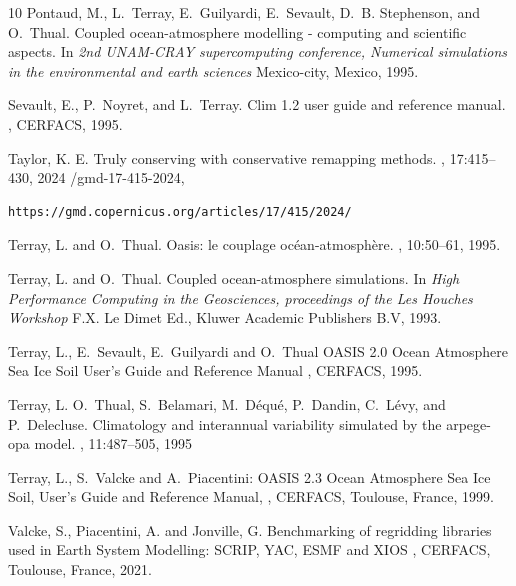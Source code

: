 \begin{thebibliography}{10}
Pontaud, M., L.~Terray, E.~Guilyardi, E.~Sevault, D.~B. Stephenson, and
  O.~Thual.
\newblock Coupled ocean-atmosphere modelling - computing and scientific
  aspects.
\newblock In {\em 2nd UNAM-CRAY supercomputing conference, Numerical
  simulations in the environmental and earth sciences}
\newblock Mexico-city, Mexico, 1995.

Sevault, E., P.~Noyret, and L.~Terray.
\newblock Clim 1.2 user guide and reference manual.
, CERFACS, 1995.

Taylor, K. E.
\newblock Truly conserving with conservative remapping methods.
, 17:415--430, 2024
/gmd-17-415-2024,  \begin{verbatim}https://gmd.copernicus.org/articles/17/415/2024/\end{verbatim}

Terray, L. and O.~Thual.
\newblock Oasis: le couplage oc\'ean-atmosph\`ere.
, 10:50--61, 1995.

Terray, L. and O.~Thual.
\newblock Coupled ocean-atmosphere simulations.
\newblock In {\em High Performance Computing in the Geosciences,
proceedings of the Les Houches Workshop}
\newblock F.X. Le Dimet Ed., Kluwer Academic Publishers B.V, 1993.

Terray, L., E.~Sevault, E.~Guilyardi and O.~Thual
\newblock OASIS 2.0 Ocean Atmosphere Sea Ice Soil User's Guide and Reference Manual
, CERFACS, 1995.

Terray, L. O.~Thual, S.~Belamari, M.~D\'equ\'e, P.~Dandin, C.~L\'evy, and
P.~Delecluse.
\newblock Climatology and interannual variability simulated by the arpege-opa
model.
, 11:487--505, 1995

Terray, L., S.~Valcke and A.~Piacentini:
\newblock OASIS 2.3 Ocean Atmosphere Sea Ice Soil, User's Guide and
Reference Manual,
,
\newblock CERFACS, Toulouse, France, 1999.

Valcke, S., Piacentini, A. and Jonville, G.
\newblock Benchmarking of regridding libraries used in Earth System
Modelling: SCRIP, YAC, ESMF and XIOS
,
\newblock CERFACS, Toulouse, France, 2021.


\end{thebibliography}

